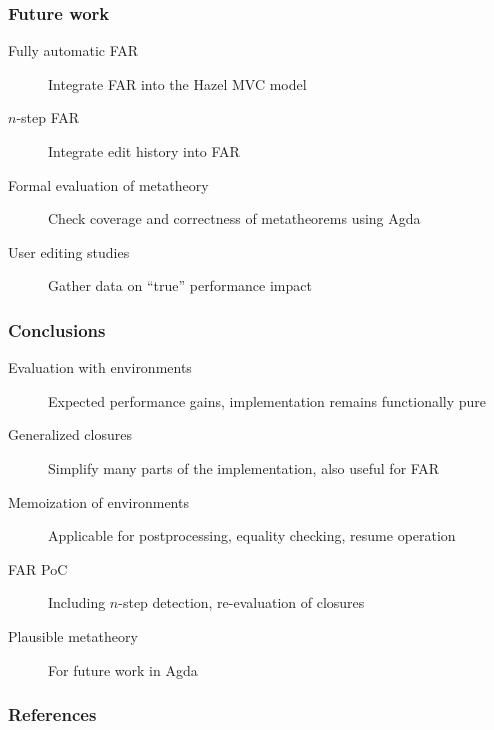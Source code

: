 \documentclass{beamer}
\begin{document}
\begin{frame}
  \frametitle{Future work}

  \begin{description}
  \item[Fully automatic FAR] Integrate FAR into the Hazel MVC model
  \item[$n$-step FAR] Integrate edit history into FAR
  \item[Formal evaluation of metatheory] Check coverage and correctness of metatheorems using Agda
  \item[User editing studies] Gather data on ``true'' performance impact
  \end{description}
\end{frame}

\begin{frame}
  \frametitle{Conclusions}

  \begin{description}
  \item[Evaluation with environments] Expected performance gains, implementation remains functionally pure
  \item[Generalized closures] Simplify many parts of the implementation, also useful for FAR
  \item[Memoization of environments] Applicable for postprocessing, equality checking, resume operation
  \item[FAR PoC] Including $n$-step detection, re-evaluation of closures
  \item[Plausible metatheory] For future work in Agda
  \end{description}
\end{frame}

\begin{frame}[allowframebreaks]
  \frametitle{References}

  \tiny
  
  
\end{frame}
\end{document}
